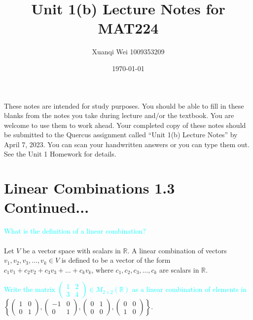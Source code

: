 \documentclass[fontsize=12pt]{scrartcl}
\title{Unit 1(b) Lecture Notes for MAT224}
\author{Xuanqi Wei 1009353209}
\date{\today}
\begin{document}
\maketitle

\noindent
These notes are intended for study purposes. You should be able to fill in these blanks from the notes you take during lecture and/or the textbook. You are welcome to use them to work ahead. Your completed copy of these notes should be submitted to the Quercus assignment called ``Unit 1(b) Lecture Notes'' by April 7, 2023. You can scan your handwritten answers or you can type them out. See the Unit 1 Homework for details.

\newpage

\section{Linear Combinations 1.3 Continued...}

\textcolor{cyan}{What is the definition of a linear combination?}\\
\\
Let $V$ be a vector space with scalars in $\mathbb{R}$. A linear combination of vectors $v_1, v_2, v_3, \ldots , v_k \in V$ is defined to be a vector of the form $c_1v_1 + c_2v_2 + c_3v_3 + \ldots + c_kv_k$, where $c_1, c_2, c_3, \ldots, c_k$ are scalars in $\mathbb{R}$.\\

\vspace{2 in}

\noindent
\textcolor{cyan}{Write the matrix $\left( \begin{array}{cc} 1 & 2\\ 3 & 4\end{array}\right) \in M_{2\times 2} (\mathbb{R})$ as a linear combination of elements in}\\

$\left\{  \left( \begin{array}{cc} 1 & 0\\ 0 & 1\end{array}\right), \left( \begin{array}{cc} -1 & 0\\ 0 & 1\end{array}\right), \left( \begin{array}{cc} 0 & 1\\ 0 & 0\end{array}\right), \left( \begin{array}{cc} 0 & 0\\ 1 & 0\end{array}\right)\right\}$.\\
\end{document}
